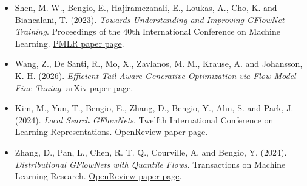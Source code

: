 \documentclass{article}
\begin{document}
\begin{itemize}
    \item Shen, M. W., Bengio, E., Hajiramezanali, E., Loukas, A., Cho, K. and Biancalani, T. (2023). \textit{Towards Understanding and Improving GFlowNet Training}. Proceedings of the 40th International Conference on Machine Learning. \href{https://proceedings.mlr.press/v202/shen23a.html}{PMLR paper page}.
    \item Wang, Z., De Santi, R., Mo, X., Zavlanos, M. M., Krause, A. and Johansson, K. H. (2026). \textit{Efficient Tail-Aware Generative Optimization via Flow Model Fine-Tuning}. \href{https://arxiv.org/abs/2602.16796}{arXiv paper page}.
    \item Kim, M., Yun, T., Bengio, E., Zhang, D., Bengio, Y., Ahn, S. and Park, J. (2024). \textit{Local Search GFlowNets}. Twelfth International Conference on Learning Representations. \href{https://openreview.net/forum?id=6cFcw1Rxww}{OpenReview paper page}.
    \item Zhang, D., Pan, L., Chen, R. T. Q., Courville, A. and Bengio, Y. (2024). \textit{Distributional GFlowNets with Quantile Flows}. Transactions on Machine Learning Research. \href{https://openreview.net/forum?id=vFSsRYGpjW}{OpenReview paper page}.
\end{itemize}

\fi
\end{document}
